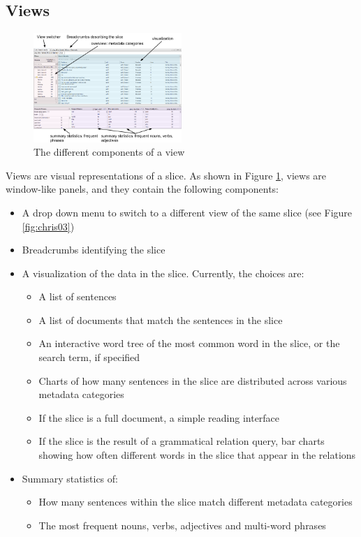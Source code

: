 \documentclass{sig-alternate}
\begin{document}
\subsection{Views}
\begin{figure}
\includegraphics[width=0.5\textwidth]{fig/sliding/01-view-breakdown.png}
\caption{The different components of a view \label{fig:view-schematic}}
\end{figure}
Views are visual representations of a slice. As shown in Figure \ref{fig:view-schematic},  views  are window-like panels, and they contain the following components:
\begin{itemize}
	\item A drop down menu to switch to a different view of the same slice (see Figure \ref{fig:chris03})
	\item Breadcrumbs identifying the slice
	\item A visualization of the data in the slice. Currently, the choices are:
		\begin{itemize}
			\item A list of sentences
			\item A list of documents that match the sentences in the slice
			\item An interactive word tree \cite{wattenberg_word_2008} of the most common word in the slice, or the search term, if specified
			\item Charts of how many sentences in the slice are distributed across various metadata categories
			\item If the slice is a full document, a simple reading interface
			\item If the slice is the result of a grammatical relation query, bar charts showing how often different words in the slice that appear in the relations
		\end{itemize}
	\item Summary statistics of:
		\begin{itemize}
			\item How many sentences within the slice match different metadata categories
			\item The most frequent nouns, verbs, adjectives and multi-word phrases
		\end{itemize}
\end{itemize}
\end{document}
